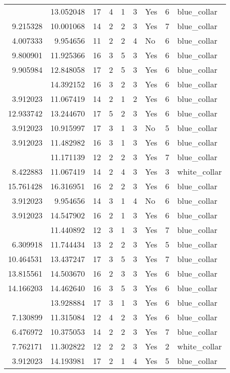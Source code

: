 \documentclass[
]{article}
\begin{document}
\begin{longtable}[t]{rrrrrllrl}
\addlinespace
3.912023 & 13.052048 & 17 & 4 & 1 & 3 & Yes & 6 & blue\_collar\\
9.215328 & 10.001068 & 14 & 2 & 2 & 3 & Yes & 7 & blue\_collar\\
4.007333 & 9.954656 & 11 & 2 & 2 & 4 & No & 6 & blue\_collar\\
9.800901 & 11.925366 & 16 & 3 & 5 & 3 & Yes & 6 & blue\_collar\\
9.905984 & 12.848058 & 17 & 2 & 5 & 3 & Yes & 6 & blue\_collar\\
\addlinespace
11.513425 & 14.392152 & 16 & 3 & 2 & 3 & Yes & 6 & blue\_collar\\
3.912023 & 11.067419 & 14 & 2 & 1 & 2 & Yes & 6 & blue\_collar\\
12.933742 & 13.244670 & 17 & 5 & 2 & 3 & Yes & 6 & blue\_collar\\
3.912023 & 10.915997 & 17 & 3 & 1 & 3 & No & 5 & blue\_collar\\
3.912023 & 11.482982 & 16 & 3 & 1 & 3 & Yes & 6 & blue\_collar\\
\addlinespace
9.174713 & 11.171139 & 12 & 2 & 2 & 3 & Yes & 7 & blue\_collar\\
8.422883 & 11.067419 & 14 & 2 & 4 & 3 & Yes & 3 & white\_collar\\
15.761428 & 16.316951 & 16 & 2 & 2 & 3 & Yes & 6 & blue\_collar\\
3.912023 & 9.954656 & 14 & 3 & 1 & 4 & No & 6 & blue\_collar\\
3.912023 & 14.547902 & 16 & 2 & 1 & 3 & Yes & 6 & blue\_collar\\
\addlinespace
3.912023 & 11.440892 & 12 & 3 & 1 & 3 & Yes & 7 & blue\_collar\\
6.309918 & 11.744434 & 13 & 2 & 2 & 3 & Yes & 5 & blue\_collar\\
10.464531 & 13.437247 & 17 & 3 & 5 & 3 & Yes & 7 & blue\_collar\\
13.815561 & 14.503670 & 16 & 2 & 3 & 3 & Yes & 6 & blue\_collar\\
14.166203 & 14.462640 & 16 & 3 & 5 & 3 & Yes & 6 & blue\_collar\\
\addlinespace
3.912023 & 13.928884 & 17 & 3 & 1 & 3 & Yes & 6 & blue\_collar\\
7.130899 & 11.315084 & 12 & 4 & 2 & 3 & Yes & 6 & blue\_collar\\
6.476972 & 10.375053 & 14 & 2 & 2 & 3 & Yes & 7 & blue\_collar\\
7.762171 & 11.302822 & 12 & 2 & 2 & 3 & Yes & 2 & white\_collar\\
3.912023 & 14.193981 & 17 & 2 & 1 & 4 & Yes & 5 & blue\_collar\\

\end{longtable}
\end{document}
